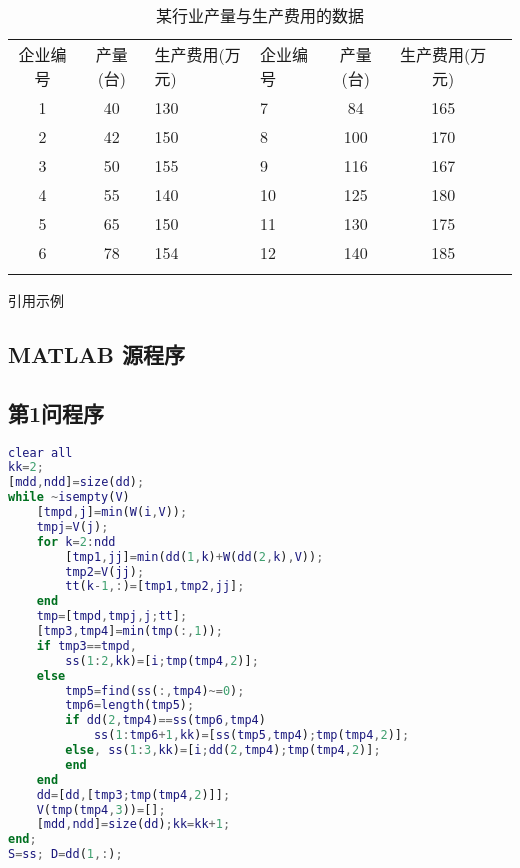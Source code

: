 \documentclass[bwprint]{gmcmthesis}
\numberwithin{equation}{section}
\numberwithin{figure}{section}
\numberwithin{table}{section}
\begin{document}
\begin{table}[!htp]
\centering
\caption{某行业产量与生产费用的数据}%
\begin{tabularx}{\textwidth}{c|c|YZc|c|Y}\Xhline{0.9pt}
	企业编号&	产量(台)&生产费用(万元)&企业编号&产量(台)&生产费用(万元)\\
	1&	40&	130&7&	84&	165\\
	2&	42&	150&8&	100&	170\\
	3&	50&	155&9&	116&	167\\
	4&	55&	140&10&	125&	180\\
	5&	65&	150&11&	130&	175\\
	6&	78&	154&12&	140&	185\\\Xhline{0.72pt}
\end{tabularx}
\end{table}





引用示例
\cite{mittelbach_latex_2004,wright_latex3_2009,beeton_unicode_2008,vieth_experiences_2009}

\clearpage





\clearpage
\begin{appendices}
\section{MATLAB 源程序}
\renewcommand{\thesubsection}{A.\arabic{subsection}}
\subsection{第1问程序}

\begin{lstlisting}[language=Matlab] %设置不同语言即可。
clear all
kk=2;
[mdd,ndd]=size(dd);
while ~isempty(V)
    [tmpd,j]=min(W(i,V));
    tmpj=V(j);
    for k=2:ndd
        [tmp1,jj]=min(dd(1,k)+W(dd(2,k),V));
        tmp2=V(jj);
        tt(k-1,:)=[tmp1,tmp2,jj];
    end
    tmp=[tmpd,tmpj,j;tt];
    [tmp3,tmp4]=min(tmp(:,1));
    if tmp3==tmpd,
        ss(1:2,kk)=[i;tmp(tmp4,2)];
    else
        tmp5=find(ss(:,tmp4)~=0);
        tmp6=length(tmp5);
        if dd(2,tmp4)==ss(tmp6,tmp4)
            ss(1:tmp6+1,kk)=[ss(tmp5,tmp4);tmp(tmp4,2)];
        else, ss(1:3,kk)=[i;dd(2,tmp4);tmp(tmp4,2)];
        end
    end
    dd=[dd,[tmp3;tmp(tmp4,2)]];
    V(tmp(tmp4,3))=[];
    [mdd,ndd]=size(dd);kk=kk+1;
end;
S=ss; D=dd(1,:);
\end{lstlisting}


\end{appendices}
\end{document}
